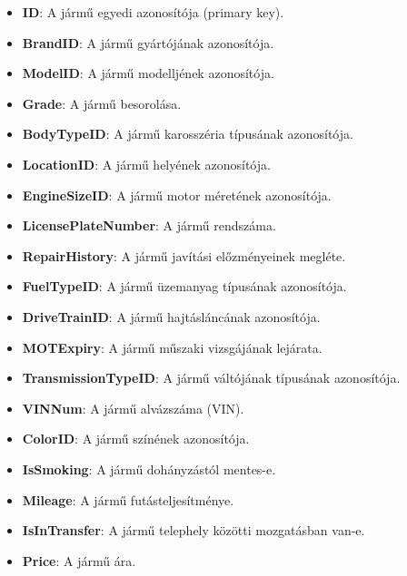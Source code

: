 \documentclass{report}[11pt]
\begin{document}
\begin{itemize}
\begin{itemize}
    \item \textbf{ID}: A jármű egyedi azonosítója (primary key).
    \item \textbf{BrandID}: A jármű gyártójának azonosítója.
    \item \textbf{ModelID}: A jármű modelljének azonosítója.
    \item \textbf{Grade}: A jármű besorolása.
    \item \textbf{BodyTypeID}: A jármű karosszéria típusának azonosítója.
    \item \textbf{LocationID}: A jármű helyének azonosítója.
    \item \textbf{EngineSizeID}: A jármű motor méretének azonosítója.
    \item \textbf{LicensePlateNumber}: A jármű rendszáma.
    \item \textbf{RepairHistory}: A jármű javítási előzményeinek megléte.
    \item \textbf{FuelTypeID}: A jármű üzemanyag típusának azonosítója.
    \item \textbf{DriveTrainID}: A jármű hajtásláncának azonosítója.
    \item \textbf{MOTExpiry}: A jármű műszaki vizsgájának lejárata.
    \item \textbf{TransmissionTypeID}: A jármű váltójának típusának azonosítója.
    \item \textbf{VINNum}: A jármű alvázszáma (VIN).
    \item \textbf{ColorID}: A jármű színének azonosítója.
    \item \textbf{IsSmoking}: A jármű dohányzástól mentes-e.
    \item \textbf{Mileage}: A jármű futásteljesítménye.
    \item \textbf{IsInTransfer}: A jármű telephely közötti mozgatásban van-e. 
    \item \textbf{Price}: A jármű ára.


\end{itemize}
\end{itemize}
\end{document}
